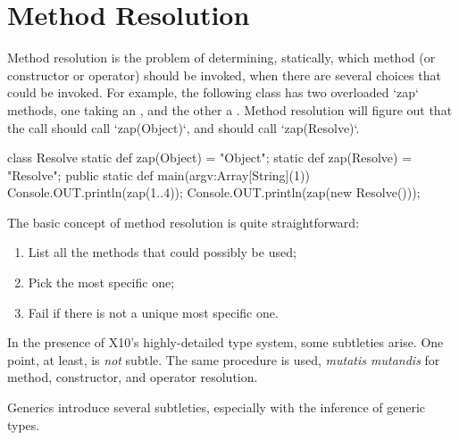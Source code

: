 \section{Method Resolution}

Method resolution is the problem of determining, statically, which method (or
constructor or operator)
should be invoked, when there are several choices that could be invoked.  For
example, the following class has two overloaded \xcd`zap` methods, one taking
an , and the other a .  Method resolution will figure
out that the call  should call \xcd`zap(Object)`, and
 should call \xcd`zap(Resolve)`.  

\begin{xten}
class Resolve {
  static def zap(Object) = "Object";
  static def zap(Resolve) = "Resolve";
  public static def main(argv:Array[String](1)) {
    Console.OUT.println(zap(1..4));
    Console.OUT.println(zap(new Resolve()));
  }
}
\end{xten}
%

The basic concept of method resolution is quite straightforward: 
\begin{enumerate}
\item List all the methods that could possibly be used;
\item Pick the most specific one;
\item Fail if there is not a unique most specific one.
\end{enumerate}
\noindent
In the presence of X10's highly-detailed type system, some subtleties arise. 
One point, at least, is {\em not} subtle. The same procedure is used, {\em
mutatis mutandis} for method, constructor, and operator resolution.  

Generics introduce several subtleties, especially with the inference of
generic types. 


